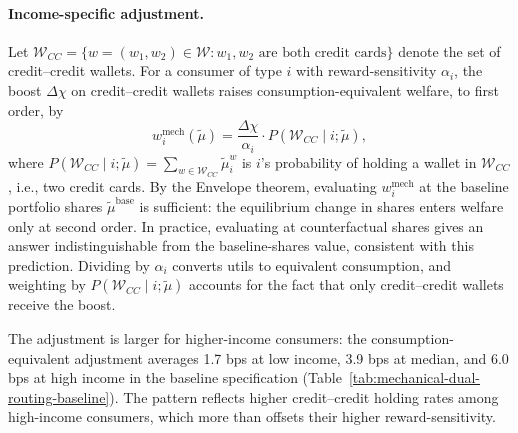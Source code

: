 \documentclass[main.tex]{subfiles}
\begin{document}
\paragraph{Income-specific adjustment.}
Let $\mathcal{W}_{CC} = \{w = (w_1, w_2) \in \mathcal{W} : w_1, w_2 \text{ are both credit cards}\}$ denote the set of credit--credit wallets.
For a consumer of type $i$ with reward-sensitivity $\alpha_i$, the boost $\Delta \chi$ on credit--credit wallets raises consumption-equivalent welfare, to first order, by
\begin{equation}
    w^{\text{mech}}_i(\tilde{\mu}) = \frac{\Delta \chi}{\alpha_i} \cdot P(\mathcal{W}_{CC}\mid i; \tilde{\mu}),
    \label{eq:mech-welfare-i}
\end{equation}
where $P(\mathcal{W}_{CC}\mid i; \tilde{\mu}) = \sum_{w\in\mathcal{W}_{CC}} \tilde{\mu}^{w}_i$ is $i$'s probability of holding a wallet in $\mathcal{W}_{CC}$, i.e., two credit cards.
By the Envelope theorem, evaluating $w^{\text{mech}}_i$ at the baseline portfolio shares $\tilde{\mu}^{\text{base}}$ is sufficient: the equilibrium change in shares enters welfare only at second order.
In practice, evaluating at counterfactual shares gives an answer indistinguishable from the baseline-shares value, consistent with this prediction.
Dividing by $\alpha_i$ converts utils to equivalent consumption, and weighting by $P(\mathcal{W}_{CC}\mid i; \tilde{\mu})$ accounts for the fact that only credit--credit wallets receive the boost.

The adjustment is larger for higher-income consumers: the consumption-equivalent adjustment averages 1.7 bps at low income, 3.9 bps at median, and 6.0 bps at high income in the baseline specification (Table~\ref{tab:mechanical-dual-routing-baseline}).
The pattern reflects higher credit--credit holding rates among high-income consumers, which more than offsets their higher reward-sensitivity.
\end{document}
